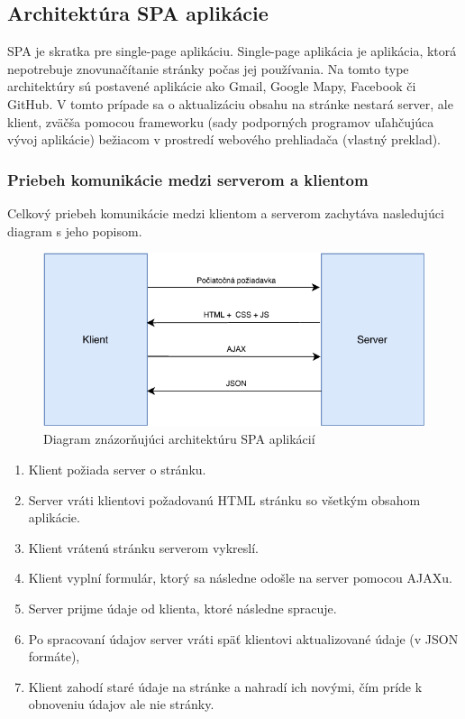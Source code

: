 \subsection{Architektúra SPA aplikácie}
SPA je skratka pre single-page aplikáciu. Single-page aplikácia je aplikácia, ktorá nepotrebuje znovunačítanie stránky počas jej používania. Na tomto type architektúry sú postavené aplikácie ako Gmail, Google Mapy, Facebook či GitHub. V tomto prípade sa o aktualizáciu obsahu na stránke nestará server, ale klient, zväčša pomocou frameworku (sady podporných programov uľahčujúca vývoj aplikácie) bežiacom v prostredí webového prehliadača \cite{spa-vs-mpa-3} (vlastný preklad).

\subsubsection*{Priebeh komunikácie medzi serverom a klientom}
Celkový priebeh komunikácie medzi klientom a serverom zachytáva nasledujúci diagram s jeho popisom.

\begin{figure}[H]
	\includegraphics[width=1.0\textwidth]{media/navrh/SPA.pdf}
	\caption{Diagram znázorňujúci architektúru SPA aplikácií}\label{spa-graf}
\end{figure}

\begin{enumerate}
	\item Klient požiada server o stránku.
	\item Server vráti klientovi požadovanú HTML stránku so všetkým obsahom aplikácie.
	\item Klient vrátenú stránku serverom vykreslí.
	\item Klient vyplní formulár, ktorý sa následne odošle na server pomocou AJAXu.
	\item Server prijme údaje od klienta, ktoré následne spracuje.
	\item Po spracovaní údajov server vráti späť klientovi aktualizované údaje (v JSON formáte),
	\item Klient zahodí staré údaje na stránke a nahradí ich novými, čím príde k obnoveniu údajov ale nie stránky.
\end{enumerate}


